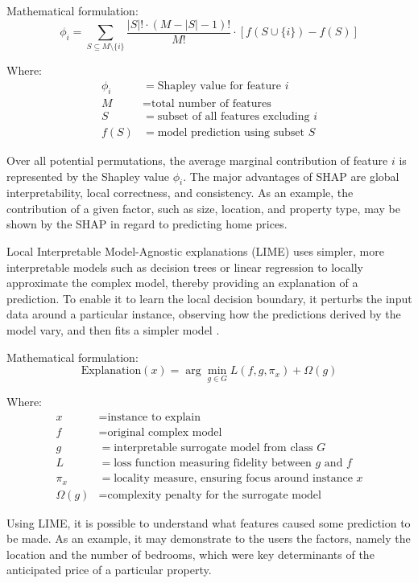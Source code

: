 \documentclass[12pt, a4paper, oneside]{book}
\begin{document}
Mathematical formulation:
\[
\phi_i = \sum_{S \subseteq M \setminus \{i\}} \frac{|S|! \cdot (M - |S| - 1)!}{M!} \cdot [f(S \cup \{i\}) - f(S)]
\]

Where:
\begin{align*}
\phi_i &= \text{Shapley value for feature } i \\
M &= \text{total number of features} \\
S &= \text{subset of all features excluding } i \\
f(S) &= \text{model prediction using subset } S
\end{align*}

Over all potential permutations, the average marginal contribution of feature $i$ is represented by the Shapley value $\phi_i$. The major advantages of SHAP are global interpretability, local correctness, and consistency. As an example, the contribution of a given factor, such as size, location, and property type, may be shown by the SHAP in regard to predicting home prices.

Local Interpretable Model-Agnostic explanations (LIME) uses simpler, more interpretable models such as decision trees or linear regression to locally approximate the complex model, thereby providing an explanation of a prediction. To enable it to learn the local decision boundary, it perturbs the input data around a particular instance, observing how the predictions derived by the model vary, and then fits a simpler model \cite{fa2022}.

Mathematical formulation:
\[
\text{Explanation}(x) = \arg\min_{g \in G} L(f, g, \pi_x) + \Omega(g)
\]

Where:
\begin{align*}
x &= \text{instance to explain} \\
f &= \text{original complex model} \\
g &= \text{interpretable surrogate model from class } G \\
L &= \text{loss function measuring fidelity between } g \text{ and } f \\
\pi_x &= \text{locality measure, ensuring focus around instance } x \\
\Omega(g) &= \text{complexity penalty for the surrogate model}
\end{align*}

Using LIME, it is possible to understand what features caused some prediction to be made. As an example, it may demonstrate to the users the factors, namely the location and the number of bedrooms, which were key determinants of the anticipated price of a particular property.
\end{document}
